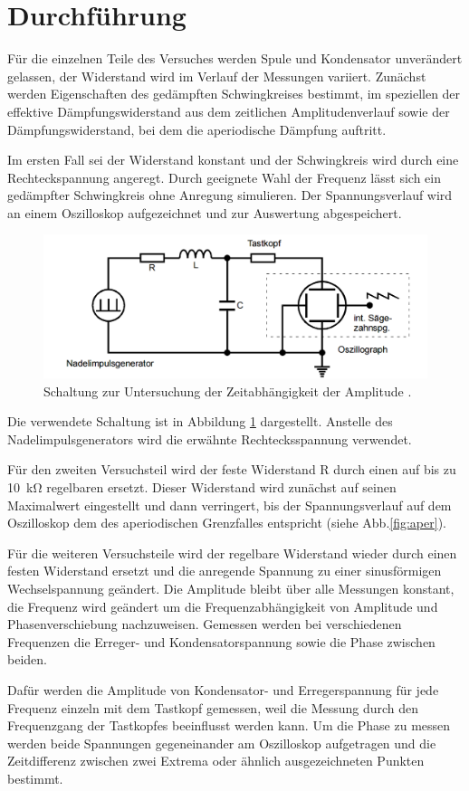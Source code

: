 \section{Durchführung}
\label{sec:Durchführung}
Für die einzelnen Teile des Versuches werden
Spule und Kondensator unverändert gelassen, der Widerstand wird im Verlauf
der Messungen variiert.
Zunächst werden Eigenschaften des gedämpften Schwingkreises bestimmt,
im speziellen der effektive
Dämpfungswiderstand aus dem zeitlichen Amplitudenverlauf
sowie der Dämpfungswiderstand, bei dem die aperiodische
Dämpfung auftritt.

Im ersten Fall sei der Widerstand konstant und der Schwingkreis wird durch eine
Rechteckspannung angeregt. Durch geeignete Wahl der Frequenz lässt sich ein
gedämpfter Schwingkreis ohne Anregung simulieren. Der Spannungsverlauf wird
an einem Oszilloskop aufgezeichnet und zur Auswertung abgespeichert.
\begin{figure}
  \centering
  \includegraphics[keepaspectratio, width=\textwidth]{5a.png}
  \caption{Schaltung zur Untersuchung der Zeitabhängigkeit
  der Amplitude \cite{officialmanual}.}
  \label{fig:5a}
\end{figure}
Die verwendete Schaltung ist in Abbildung \ref{fig:5a} dargestellt. Anstelle des
Nadelimpulsgenerators wird die erwähnte Rechtecksspannung verwendet.

Für den zweiten Versuchsteil wird der feste Widerstand R durch einen auf bis zu
\SI{10}{\kilo\ohm} regelbaren ersetzt. Dieser Widerstand wird zunächst auf seinen
Maximalwert eingestellt und dann verringert, bis der Spannungsverlauf
auf dem Oszilloskop dem des aperiodischen Grenzfalles entspricht
(siehe Abb.\ref{fig:aper}).

Für die weiteren Versuchsteile wird der regelbare Widerstand wieder durch einen
festen Widerstand ersetzt und die anregende Spannung zu einer sinusförmigen
Wechselspannung geändert. Die Amplitude bleibt über alle Messungen konstant,
die Frequenz wird geändert um die Frequenzabhängigkeit von Amplitude und
Phasenverschiebung nachzuweisen.
Gemessen werden bei verschiedenen Frequenzen die Erreger- und
Kondensatorspannung sowie die Phase zwischen beiden.

Dafür werden die Amplitude von Kondensator- und Erregerspannung für jede
Frequenz einzeln mit dem Tastkopf gemessen,
weil die Messung durch den Frequenzgang der Tastkopfes beeinflusst werden kann.
Um die Phase zu messen werden beide Spannungen gegeneinander am Oszilloskop
aufgetragen und die Zeitdifferenz zwischen zwei Extrema
oder ähnlich ausgezeichneten Punkten bestimmt.
